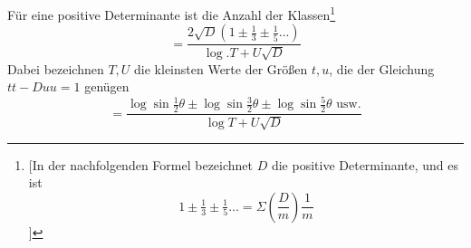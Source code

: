 Für eine positive Determinante ist die Anzahl der Klassen\begingroup\renewcommand{\thefootnote}{**)}\footnote{[In der nachfolgenden Formel bezeichnet $D$ die positive Determinante, und es ist
\[
1\pm\tfrac13\pm\tfrac15\ldots=\Sigma\left(\frac Dm\right)\frac1m
\]
]}\endgroup
\[
=\frac{2\surd D(1\pm\tfrac13\pm\tfrac15\ldots)}{\log .T+U\surd D}
\]
Dabei bezeichnen $T,U$ die kleinsten Werte der Größen $t,u$, die der Gleichung $tt-Duu=1$ genügen
\[
=\frac{\log\sin\tfrac12\theta\pm\log\sin\tfrac32\theta\pm\log\sin\tfrac52\theta\text{ usw.}}{\log T+U\surd D}
\]
